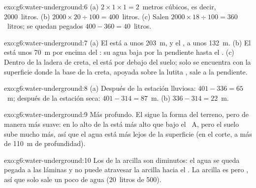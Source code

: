 \begin{solution}{exo:g6:water-underground:6}
(a) $2 \times 1 \times 1 = 2$~metros cúbicos, es decir, 2000~litros.
(b) $2000 \times 20 \div 100 = 400$~litros. (c) Salen $2000 \times 18 \div 100 =
360$~litros; se quedan pegados $400 - 360 = 40$~litros.
\end{solution}

\begin{solution}{exo:g6:water-underground:7}
(a) El  está a unos 203~m, y el , a unos 132~m. (b) El
 está unos 70~m por encima del : su agua baja por la pendiente
hasta el . (c) Dentro de la ladera de creta, el  está por
debajo del suelo; solo se encuentra con la superficie donde la base de la
creta, apoyada sobre la lutita , sale a la pendiente.
\end{solution}

\begin{solution}{exo:g6:water-underground:8}
(a) Después de la estación lluviosa: $401 - 336 = 65$~m; después de la
estación seca: $401 - 314 = 87$~m. (b) $336 - 314 = 22$~m.
\end{solution}

\begin{solution}{exo:g6:water-underground:9}
Más profundo. El  sigue la forma del terreno, pero de manera
más suave: en lo alto de la  está más alto que bajo el ~A, pero
el suelo sube mucho más, así que el agua está más lejos de la superficie
(en el corte, a más de 110~m de profundidad).
\end{solution}

\begin{solution}{exo:g6:water-underground:10}
Los  de la arcilla son diminutos: el agua se queda pegada a las
láminas y no puede atravesar la arcilla hacia el . La arcilla es 
pero , así que solo sale un poco de agua (20~litros de 500).
\end{solution}

